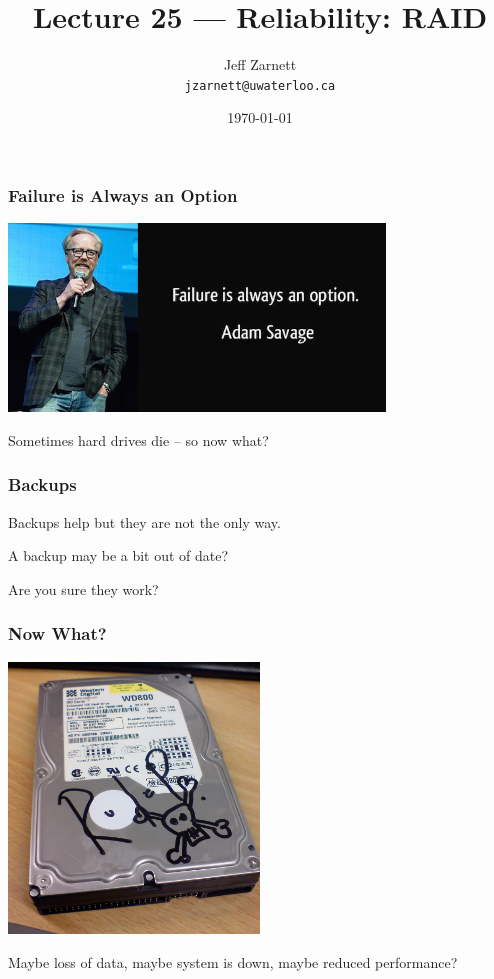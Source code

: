 

\title{Lecture 25 --- Reliability: RAID }

\author{Jeff Zarnett \\ \small \texttt{jzarnett@uwaterloo.ca}}
\date{\today}




\begin{frame}
  \titlepage

 \end{frame}


\begin{frame}
\frametitle{Failure is Always an Option}

\begin{center}
	\includegraphics[width=0.75\textwidth]{images/failure.jpg}
\end{center}

Sometimes hard drives die -- so now what?

\end{frame}


\begin{frame}
\frametitle{Backups}

Backups help but they are not the only way.

A backup may be a bit out of date?

Are you sure they work?

\end{frame}


\begin{frame}
\frametitle{Now What?}

\begin{center}
	\includegraphics[width=0.5\textwidth]{images/rip-hdd.jpg}
\end{center}

Maybe loss of data, maybe system is down, maybe reduced performance?

\end{frame}


